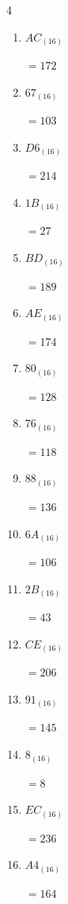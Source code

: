 \begin{multicols}{4}
\begin{enumerate}
        $=212$

  \item $AC_{(16)}$

        $=172$

  \item $67_{(16)}$

        $=103$

  \item $D6_{(16)}$

        $=214$

  \item $1B_{(16)}$

        $=27$

  \item $BD_{(16)}$

        $=189$

  \item $AE_{(16)}$

        $=174$

\columnbreak %

  \item $80_{(16)}$

        $=128$

  \item $76_{(16)}$

        $=118$

  \item $88_{(16)}$

        $=136$

  \item $6A_{(16)}$

        $=106$

  \item $2B_{(16)}$

        $=43$

  \item $CE_{(16)}$

        $=206$

  \item $91_{(16)}$

        $=145$

  \item $8_{(16)}$

        $=8$

  \item $EC_{(16)}$

        $=236$

  \item $A4_{(16)}$

        $=164$


\end{enumerate}
\end{multicols}
